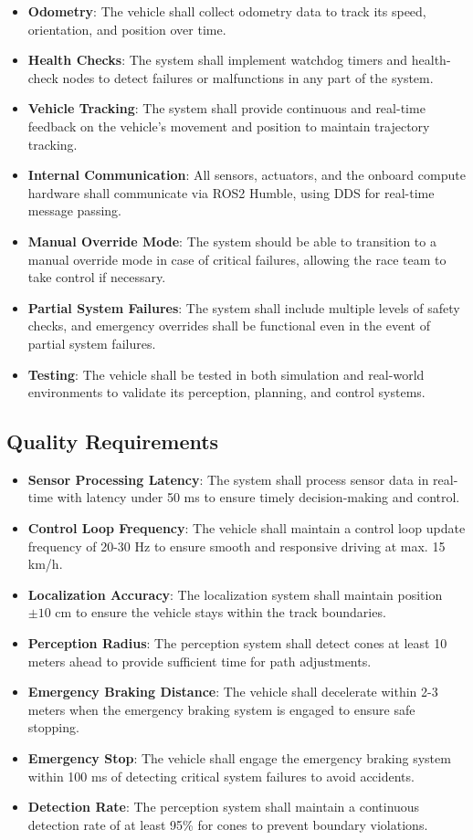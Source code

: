 \begin{itemize}
    \item \textbf{Odometry}: The vehicle shall collect odometry data to track its speed, orientation, and position over time.
    \item \textbf{Health Checks}: The system shall implement watchdog timers and health-check nodes to detect failures or malfunctions in any part of the system.
    \item \textbf{Vehicle Tracking}: The system shall provide continuous and real-time feedback on the vehicle's movement and position to maintain trajectory tracking.
    \item \textbf{Internal Communication}: All sensors, actuators, and the onboard compute hardware shall communicate via ROS2 Humble, using DDS for real-time message passing.
    \item \textbf{Manual Override Mode}: The system should be able to transition to a manual override mode in case of critical failures, allowing the race team to take control if necessary.
    \item \textbf{Partial System Failures}: The system shall include multiple levels of safety checks, and emergency overrides shall be functional even in the event of partial system failures.
    \item \textbf{Testing}: The vehicle shall be tested in both simulation and real-world environments to validate its perception, planning, and control systems.
\end{itemize}

\subsection{Quality Requirements}

\begin{itemize}
    \item \textbf{Sensor Processing Latency}: The system shall process sensor data in real-time with latency under 50 ms to ensure timely decision-making and control.
    \item \textbf{Control Loop Frequency}: The vehicle shall maintain a control loop update frequency of 20-30 Hz to ensure smooth and responsive driving at max. 15 km/h.
    \item \textbf{Localization Accuracy}: The localization system shall maintain position \(\pm 10\) cm to ensure the vehicle stays within the track boundaries.
    \item \textbf{Perception Radius}: The perception system shall detect cones at least 10 meters ahead to provide sufficient time for path adjustments.
    \item \textbf{Emergency Braking Distance}: The vehicle shall decelerate within 2-3 meters when the emergency braking system is engaged to ensure safe stopping.
    \item \textbf{Emergency Stop}: The vehicle shall engage the emergency braking system within 100 ms of detecting critical system failures to avoid accidents.
    \item \textbf{Detection Rate}: The perception system shall maintain a continuous detection rate of at least 95\% for cones to prevent boundary violations.
\end{itemize}